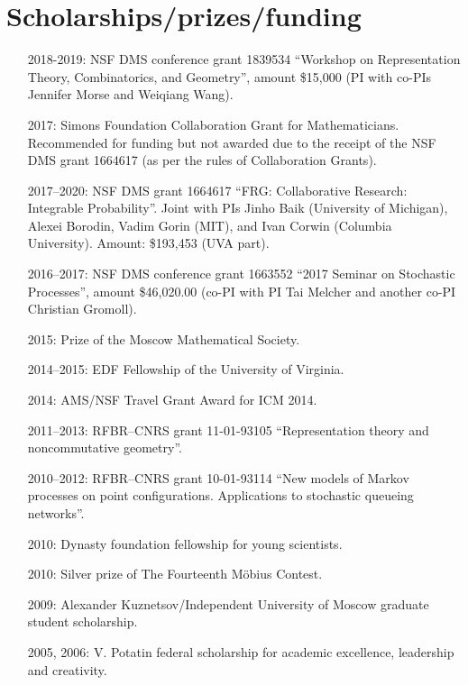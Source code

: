 \documentclass[letterpaper,11pt]{article}
\begin{document}
\section*{Scholarships/prizes/funding}
\begin{itemize}
	\item 
				[2018-2019:]
				NSF DMS conference grant 
				1839534
				``Workshop on Representation Theory, Combinatorics, and Geometry'',
				amount \$15,000
				(PI with co-PIs Jennifer Morse and Weiqiang Wang).
	\item
	      [2017:] Simons Foundation Collaboration Grant for
	      Mathematicians. Recommended for funding but not awarded due to
	      the receipt of the NSF DMS grant 1664617 (as per the rules of Collaboration
	      Grants).
	\item
	      [2017--2020:] NSF DMS grant 1664617
	      ``FRG: Collaborative Research: Integrable Probability''.
	      Joint with PIs Jinho Baik (University of Michigan), Alexei
	      Borodin, Vadim Gorin (MIT), and Ivan Corwin (Columbia University). Amount:
	      \$193,453 (UVA part).
	\item
	      [2016--2017:]
	      NSF DMS conference grant 1663552 ``2017 Seminar on Stochastic
	      Processes'', amount \$46,020.00 (co-PI with PI Tai Melcher and another co-PI
	      Christian Gromoll).
	\item
	      [2015:] Prize of the Moscow Mathematical Society.
	\item
	      [2014--2015:] EDF Fellowship of the University of Virginia.
	\item
	      [2014:] AMS/NSF Travel Grant Award for ICM 2014.
	\item
	      [2011--2013:] RFBR--CNRS grant 11-01-93105 ``Representation
	      theory and noncommutative geometry''.
	\item
	      [2010--2012:] RFBR--CNRS grant 10-01-93114 ``New models of
	      Markov processes on point configurations. Applications to
	      stochastic queueing networks''.
	\item
	      [2010:] Dynasty foundation fellowship for young scientists.
	\item
	      [2010:] Silver prize of The Fourteenth M\"obius Contest.
	\item
	      [2009:] Alexander Kuznetsov/Independent University of Moscow
	      graduate student scholarship.
	\item
	      [2005, 2006:] V. Potatin federal scholarship for academic
	      excellence, leadership and creativity.
\end{itemize}
\end{document}
